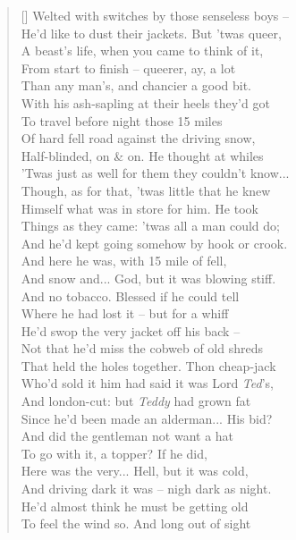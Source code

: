 \documentclass[MAIN]{subfiles}
\begin{document}
\begin{verse}[\versewidth]
Welted with switches by those senseless boys --\\
He'd like to dust their jackets. But 'twas queer,\\
A beast's life, when you came to think of it,\\
From start to finish -- queerer, ay, a lot\\
Than any man's, and chancier a good bit.\\
With his ash-sapling at their heels they'd got\\
To travel before night those 15 miles\\
Of hard fell road against the driving snow,\\
Half-blinded, on \& on. He thought at whiles\\
'Twas just as well for them they couldn't know...\\
Though, as for that, 'twas little that he knew\\
Himself what was in store for him. He took\\
Things as they came: 'twas all a man could do;\\
And he'd kept going somehow by hook or crook.\\
And here he was, with 15 mile of fell,\\
And snow and... God, but it was blowing stiff.\\
And no tobacco. Blessed if he could tell\\
Where he had lost it -- but for  a whiff\\
He'd swop the very jacket off his back --\\
Not that he'd miss the cobweb of old shreds\\
That held the holes together. Thon cheap-jack\\
Who'd sold it him had said it was Lord \emph{Ted}'s,\\
And london-cut: but \emph{Teddy} had grown fat\\
Since he'd been made an alderman... His bid?\\
And did the gentleman not want a hat\\
To go with it, a topper? If he did,\\
Here was the very... Hell, but it was cold,\\
And driving dark it was -- nigh dark as night.\\
He'd almost think he must be getting old\\
To feel the wind so. And long out of sight\\

\end{verse}
\end{document}
